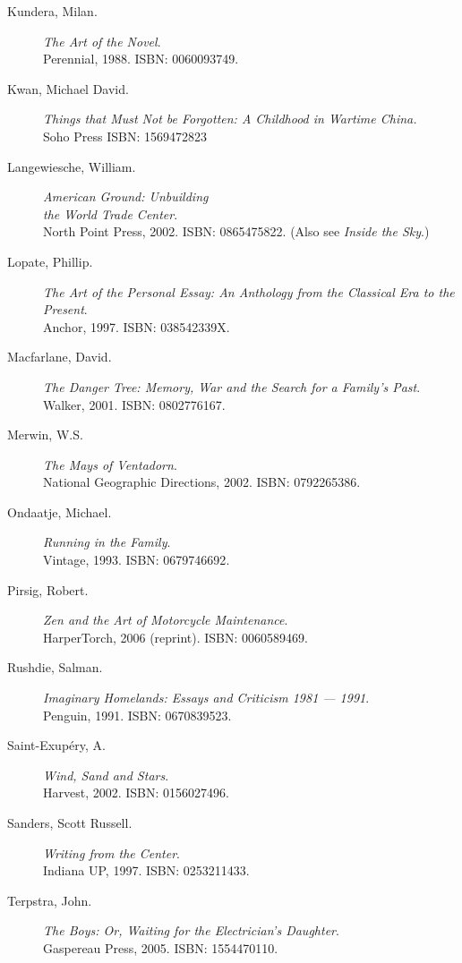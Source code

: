 \documentclass[letterpaper,oneside]{memoir}
\begin{document}
\begin{description}
\item [Kundera, Milan.] \textit{The Art of the Novel}. \\Perennial,
  1988. \textsc{ISBN: 0060093749.}

\item [Kwan, Michael David.] \textit{Things that Must Not be Forgotten: A Childhood in Wartime China.} \\Soho Press \textsc{ISBN: 1569472823}

\item [Langewiesche, William.] \textit{American Ground: Unbuilding \\the World Trade Center}. \\North Point Press, 2002. \textsc{ISBN: 0865475822}. (Also see \textit{Inside the Sky}.)

\item [Lopate, Phillip.] \textit{The Art of the Personal Essay: An Anthology from the Classical Era to the Present}. \\Anchor, 1997. \textsc{ISBN: 038542339X}.

\item [Macfarlane, David.] \textit{The Danger Tree: Memory, War and the Search for a Family's Past}. \\Walker, 2001. \textsc{ISBN: 0802776167}.

\item [Merwin, W.S.] \textit{The Mays of Ventadorn}. \\National Geographic Directions, 2002. \textsc{ISBN: 0792265386}.

\item [Ondaatje, Michael.] \textit{Running in the Family}. \\Vintage, 1993. \textsc{ISBN: 0679746692}.

\item [Pirsig, Robert.] \textit{Zen and the Art of Motorcycle
    Maintenance}. \\HarperTorch, 2006 (reprint). \textsc{ISBN:
    0060589469}.

\item [Rushdie, Salman.] \textit{Imaginary Homelands: Essays and
    Criticism 1981 --- 1991}. \\Penguin, 1991. \textsc{ISBN: 0670839523}.

\item [Saint-Exup\'ery, A.] \textit{Wind, Sand and Stars}. \\Harvest, 2002. \textsc{ISBN: 0156027496}.

\item [Sanders, Scott Russell.] \textit{Writing from the Center}. \\Indiana UP, 1997. \textsc{ISBN: 0253211433}.

\item [Terpstra, John.] \textit{The Boys: Or, Waiting for the Electrician's Daughter}. \\Gaspereau Press, 2005. \textsc{ISBN: 1554470110}.
\end{description}
\end{document}
